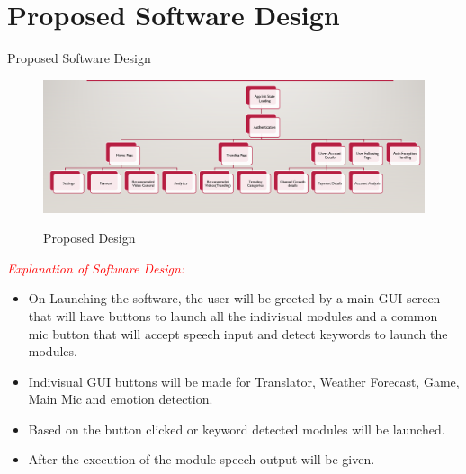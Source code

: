 \documentclass{beamer}
\begin{document}
\section{Proposed Software Design}
\begin{frame}[allowframebreaks]{Proposed Software Design}
    \begin{figure}
		{\includegraphics[scale=.4]{arch.PNG}}
			\caption{Proposed Design}
			\label{arch}
	\end{figure}
	\begin{center}
	\textcolor{red}{\textit{Explanation of Software Design: }}\\
	\begin{itemize}
		\item  On Launching the software, the user will be greeted by a main GUI screen that will have buttons to launch all the indivisual modules and a common mic button that will accept speech input and detect keywords to launch the modules.
		\item  Indivisual GUI buttons will be made for Translator, Weather Forecast, Game, Main Mic and emotion detection.
		\item  Based on the button clicked or keyword detected modules will be launched.
		\item  After the execution of the module speech output will be given.
		\end{itemize}
    \end{center}
	
\end{frame}
\end{document}
